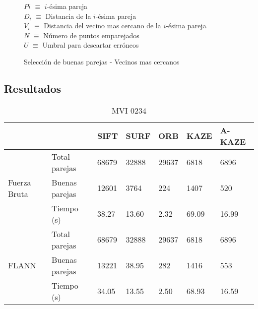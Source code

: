 \begin{figure}[h]
	\centering
	\begin{minipage}{.75\linewidth}
		\begin{algorithm}[H] %
			\caption{Selección de buenas parejas - Vecinos mas cercanos}
			\label{vecinosmascercanos}
			\SetAlgoLined
			$P{i}$ $\equiv$ $i$-ésima pareja\\
			$D_{i}$ $\equiv$ Distancia de la $i$-ésima pareja\\
			$V_{i}$ $\equiv$ Distancia del vecino mas cercano de la $i$-ésima pareja\\
			$N$ $\equiv$ Número de puntos emparejados\\
			$U$ $\equiv$ Umbral para descartar erróneos\\
		\end{algorithm}
	\end{minipage}
\end{figure}
\subsection{Resultados}

\begin{table}[]
	\centering
	\caption{MVI 0234}
	\label{my-label}
	\begin{tabular}{@{}lllllll@{}}
		\toprule
			 &                				& SIFT & SURF & ORB & KAZE & A-KAZE \\ \midrule 
		       \hfill\vline& Total parejas  & 68679& 32888&29637& 6818 & 6896   \\
		Fuerza Bruta \vline& Buenas parejas & 12601& 3764 & 224 & 1407 & 520    \\
			   \vspace{0.5cm}
			   \hfill\vline& Tiempo (s)     & 38.27&13.60 &2.32 &69.09 & 16.99  \\
			   
			   \hfill\vline& Total parejas  & 68679& 32888&29637& 6818 & 6896   \\
		FLANN  \hfill\vline& Buenas parejas &13221 & 38.95& 282 & 1416 &553     \\ 
			   \hfill\vline& Tiempo (s)     & 34.05& 13.55& 2.50& 68.93& 16.59  \\ 
			   \bottomrule
	\end{tabular}
\end{table}


